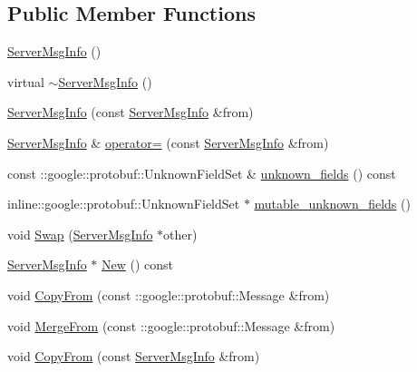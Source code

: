 \subsection*{Public Member Functions}
\begin{DoxyCompactItemize}
\item 
\hyperlink{class_i_m_1_1_base_define_1_1_server_msg_info_ac390d54935d60af660affd85a35295e3}{Server\+Msg\+Info} ()
\item 
virtual \hyperlink{class_i_m_1_1_base_define_1_1_server_msg_info_a7ca10d85c112a00cecba9858da5eb980}{$\sim$\+Server\+Msg\+Info} ()
\item 
\hyperlink{class_i_m_1_1_base_define_1_1_server_msg_info_a8860fb3b7510efb5b03ceb604abfb8cb}{Server\+Msg\+Info} (const \hyperlink{class_i_m_1_1_base_define_1_1_server_msg_info}{Server\+Msg\+Info} \&from)
\item 
\hyperlink{class_i_m_1_1_base_define_1_1_server_msg_info}{Server\+Msg\+Info} \& \hyperlink{class_i_m_1_1_base_define_1_1_server_msg_info_a131ed8856a340d312e66f905dcbbef51}{operator=} (const \hyperlink{class_i_m_1_1_base_define_1_1_server_msg_info}{Server\+Msg\+Info} \&from)
\item 
const \+::google\+::protobuf\+::\+Unknown\+Field\+Set \& \hyperlink{class_i_m_1_1_base_define_1_1_server_msg_info_a7b5cdc6972fe98c32760de43538b8c96}{unknown\+\_\+fields} () const 
\item 
inline\+::google\+::protobuf\+::\+Unknown\+Field\+Set $\ast$ \hyperlink{class_i_m_1_1_base_define_1_1_server_msg_info_aa487cad65e8ce638c1b7813534d4f8e2}{mutable\+\_\+unknown\+\_\+fields} ()
\item 
void \hyperlink{class_i_m_1_1_base_define_1_1_server_msg_info_ade208d0afd756cf55ec33cb3413fdb50}{Swap} (\hyperlink{class_i_m_1_1_base_define_1_1_server_msg_info}{Server\+Msg\+Info} $\ast$other)
\item 
\hyperlink{class_i_m_1_1_base_define_1_1_server_msg_info}{Server\+Msg\+Info} $\ast$ \hyperlink{class_i_m_1_1_base_define_1_1_server_msg_info_a9cb5e32d050472f2205a3082f816ffed}{New} () const 
\item 
void \hyperlink{class_i_m_1_1_base_define_1_1_server_msg_info_a73f1a30e7d1ff155a2cfa1e1af403a12}{Copy\+From} (const \+::google\+::protobuf\+::\+Message \&from)
\item 
void \hyperlink{class_i_m_1_1_base_define_1_1_server_msg_info_a2ca3b29b8d95f6d1c018bf643c3b114a}{Merge\+From} (const \+::google\+::protobuf\+::\+Message \&from)
\item 
void \hyperlink{class_i_m_1_1_base_define_1_1_server_msg_info_aa0104537d35b17326372cb6783d34377}{Copy\+From} (const \hyperlink{class_i_m_1_1_base_define_1_1_server_msg_info}{Server\+Msg\+Info} \&from)

\end{DoxyCompactItemize}
